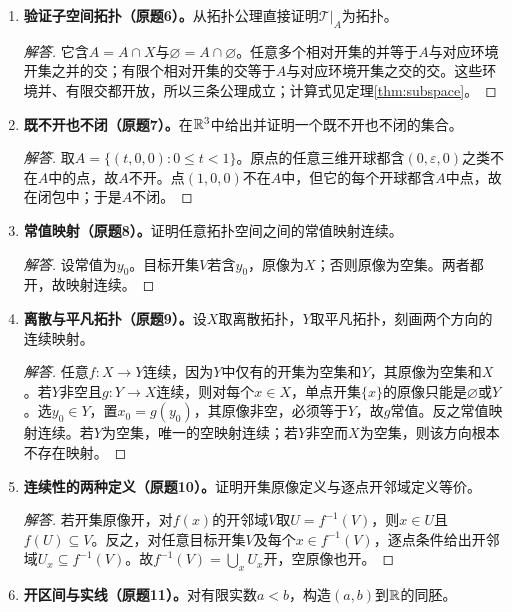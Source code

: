 \begin{enumerate}[label=\textbf{1.\arabic*.},ref=1.\arabic*,leftmargin=*]
\begin{proof}[解答]
令$U_n=(-1/n,1/n)$。$0$在所有$U_n$中；若$x\ne0$，选$n>1/|x|$便有$x\notin U_n$，故交为$\{0\}$。该单点集不含任何$0$的开区间邻域，因此不是开集。
\end{proof}
\item \textbf{验证子空间拓扑（原题6）。}从拓扑公理直接证明$\mathcal T|_A$为拓扑。
\begin{proof}[解答]
它含$A=A\cap X$与$\varnothing=A\cap\varnothing$。任意多个相对开集的并等于$A$与对应环境开集之并的交；有限个相对开集的交等于$A$与对应环境开集之交的交。这些环境并、有限交都开放，所以三条公理成立；计算式见定理\ref{thm:subspace}。
\end{proof}
\item \textbf{既不开也不闭（原题7）。}在$\mathbb{R}^3$中给出并证明一个既不开也不闭的集合。
\begin{proof}[解答]
取$A=\{(t,0,0):0\leq t<1\}$。原点的任意三维开球都含$(0,\varepsilon,0)$之类不在$A$中的点，故$A$不开。点$(1,0,0)$不在$A$中，但它的每个开球都含$A$中点，故在闭包中；于是$A$不闭。
\end{proof}
\item \textbf{常值映射（原题8）。}证明任意拓扑空间之间的常值映射连续。
\begin{proof}[解答]
设常值为$y_0$。目标开集$V$若含$y_0$，原像为$X$；否则原像为空集。两者都开，故映射连续。
\end{proof}
\item \textbf{离散与平凡拓扑（原题9）。}设$X$取离散拓扑，$Y$取平凡拓扑，刻画两个方向的连续映射。
\begin{proof}[解答]
任意$f:X\to Y$连续，因为$Y$中仅有的开集为空集和$Y$，其原像为空集和$X$。若$Y$非空且$g:Y\to X$连续，则对每个$x\in X$，单点开集$\{x\}$的原像只能是$\varnothing$或$Y$。选$y_0\in Y$，置$x_0=g(y_0)$，其原像非空，必须等于$Y$，故$g$常值。反之常值映射连续。若$Y$为空集，唯一的空映射连续；若$Y$非空而$X$为空集，则该方向根本不存在映射。
\end{proof}
\item \textbf{连续性的两种定义（原题10）。}证明开集原像定义与逐点开邻域定义等价。
\begin{proof}[解答]
若开集原像开，对$f(x)$的开邻域$V$取$U=f^{-1}(V)$，则$x\in U$且$f(U)\subseteq V$。反之，对任意目标开集$V$及每个$x\in f^{-1}(V)$，逐点条件给出开邻域$U_x\subseteq f^{-1}(V)$。故$f^{-1}(V)=\bigcup_xU_x$开，空原像也开。
\end{proof}
\item \textbf{开区间与实线（原题11）。}对有限实数$a<b$，构造$(a,b)$到$\mathbb{R}$的同胚。

\end{enumerate}
